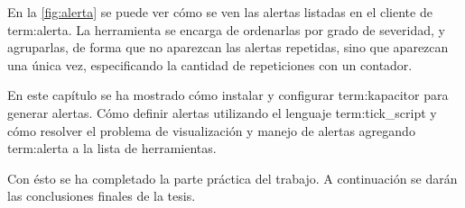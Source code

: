 En la \autoref{fig:alerta} se puede ver cómo se ven las alertas listadas en el
cliente de \gls{term:alerta}. La herramienta se encarga de ordenarlas por grado
de severidad, y agruparlas, de forma que no aparezcan las alertas repetidas,
sino que aparezcan una única vez, especificando la cantidad de repeticiones con
un contador.

En este capítulo se ha mostrado cómo instalar y configurar \gls{term:kapacitor}
para generar alertas. Cómo definir alertas utilizando el lenguaje
\gls{term:tick_script} y cómo resolver el problema de visualización y manejo de
alertas agregando \gls{term:alerta} a la lista de herramientas.

Con ésto se ha completado la parte práctica del trabajo. A continuación
se darán las conclusiones finales de la tesis.
